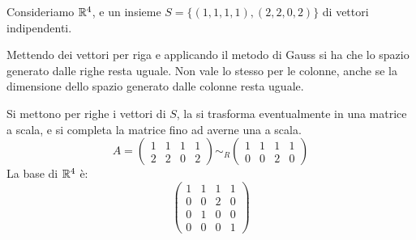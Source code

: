 \begin{exmp}
Consideriamo $\mathbb{R}^4$, e un insieme $S = \{ (1,1,1,1), (2,2,0,2) \}$ di vettori indipendenti.

Mettendo dei vettori per riga e applicando il metodo di Gauss si ha che lo spazio generato dalle righe resta uguale. Non vale lo stesso per le colonne, anche se la dimensione dello spazio generato dalle colonne resta uguale.

Si mettono per righe i vettori di $S$, la si trasforma eventualmente in una matrice a scala, e si completa la matrice fino ad averne una a scala.
\[
A = 
\begin{pmatrix}
1 & 1 & 1 & 1 \\
2 & 2 & 0 & 2
\end{pmatrix}
\sim_R
\begin{pmatrix}
1 & 1 & 1 & 1 \\
0 & 0 & 2 & 0
\end{pmatrix}
\]
La base di $\mathbb{R}^4$ \`e:
\[
\begin{pmatrix}
1 & 1 & 1 & 1 \\
0 & 0 & 2 & 0 \\
0 & 1 & 0 & 0 \\
0 & 0 & 0 & 1
\end{pmatrix}
\]
\end{exmp}

